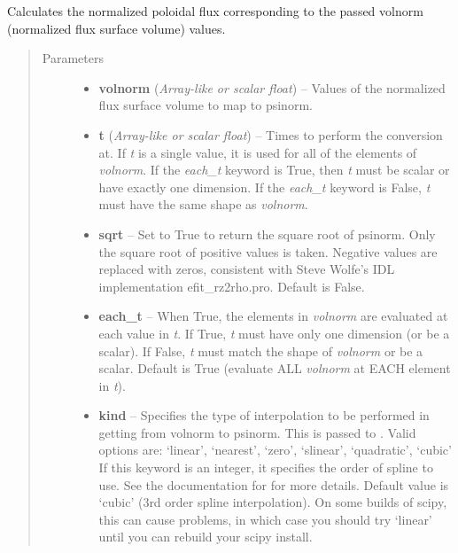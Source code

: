 \documentclass[letterpaper,10pt,english]{sphinxmanual}
\begin{document}
\begin{fulllineitems}
\begin{fulllineitems}
\end{fulllineitems}


\begin{fulllineitems}
\label{eqtools:eqtools.core.Equilibrium.volnorm2psinorm}
Calculates the normalized poloidal flux corresponding to the passed volnorm (normalized flux surface volume) values.
\begin{quote}\begin{description}
\item[{Parameters}] \leavevmode\begin{itemize}
\item {} 
\textbf{volnorm} (\emph{Array-like or scalar float}) -- Values of the normalized
flux surface volume to map to psinorm.

\item {} 
\textbf{t} (\emph{Array-like or scalar float}) -- Times to perform the conversion at.
If \emph{t} is a single value, it is used for all of the elements of
\emph{volnorm}. If the \emph{each\_t} keyword is True, then \emph{t} must be scalar
or have exactly one dimension. If the \emph{each\_t} keyword is False,
\emph{t} must have the same shape as \emph{volnorm}.

\item {} 
\textbf{sqrt} -- Set to True to return the square root of psinorm.
Only the square root of positive values is taken. Negative
values are replaced with zeros, consistent with Steve Wolfe's
IDL implementation efit\_rz2rho.pro. Default is False.

\item {} 
\textbf{each\_t} -- When True, the elements in \emph{volnorm} are evaluated
at each value in \emph{t}. If True, \emph{t} must have only one dimension
(or be a scalar). If False, \emph{t} must match the shape of \emph{volnorm}
or be a scalar. Default is True (evaluate ALL \emph{volnorm} at EACH
element in \emph{t}).

\item {} 
\textbf{kind} -- Specifies the type of
interpolation to be performed in getting from volnorm to
psinorm. This is passed to
. Valid options are:
`linear', `nearest', `zero', `slinear', `quadratic', `cubic'
If this keyword is an integer, it specifies the order of spline
to use. See the documentation for  for more
details. Default value is `cubic' (3rd order spline
interpolation). On some builds of scipy, this can cause problems,
in which case you should try `linear' until you can rebuild your
scipy install.


\end{itemize}
\end{description}
\end{quote}
\end{fulllineitems}
\end{fulllineitems}
\end{document}
